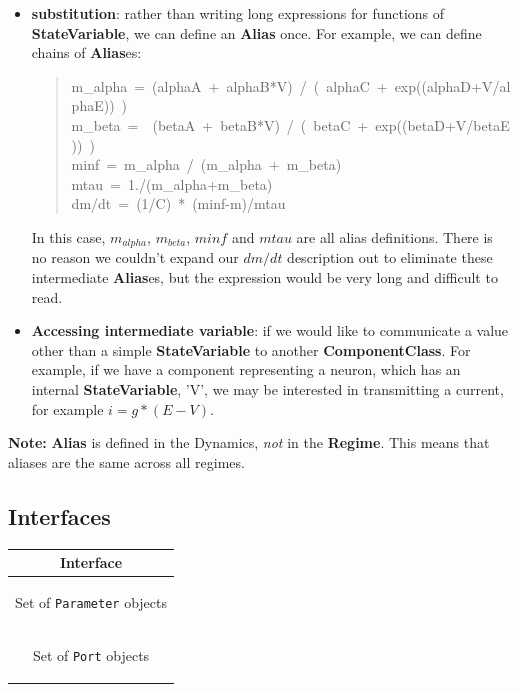 \documentclass{article}
\newcommand{\note}[1]{%
\begin{center}
\colorbox{issuecolor}{\parbox{0.8\linewidth}{\textbf{Note:} #1}}
\end{center}%
}
\newcommand{\ComponentClass}{{\bf{ComponentClass}}\xspace}
\newcommand{\StateVariable}{{\bf{StateVariable}}\xspace}
\newcommand{\Alias}{{\bf{Alias}}\xspace}
\newcommand{\Aliases}{{\bf{Alias}}es\xspace}
\newcommand{\Regime}{{\bf{Regime}}\xspace}
\begin{document}
\begin{itemize}
\item {\bf substitution}: rather than writing long expressions for functions of
\StateVariable, we can define an \Alias once. For example, we can define chains
of \Aliases:
%
\begin{quote}{\ttfamily \raggedright \noindent
m\_alpha~=~(alphaA~+~alphaB*V)~/~(~alphaC~+~exp((alphaD+V/alphaE))~)\\
m\_beta~=~~(betaA~+~betaB*V)~/~(~betaC~+~exp((betaD+V/betaE))~)\\
minf~=~m\_alpha~/~(m\_alpha~+~m\_beta)\\
mtau~=~1./(m\_alpha+m\_beta)\\
dm/dt~=~(1/C)~*~(minf-m)/mtau
}
\end{quote}

In this case, $m_{alpha}$, $m_{beta}$, $minf$ and $mtau$ are all
alias definitions. There is no reason we couldn't expand our $dm/dt$
description out to eliminate these intermediate \Aliases, but the expression
would be very long and difficult to read.

\item {\bf Accessing intermediate variable}: if we would like to communicate a
value other than a simple \StateVariable to another \ComponentClass. For
example, if we have a component representing a
neuron, which has an internal \StateVariable, 'V', we may be interested in
transmitting a current, for example $i=g*(E-V)$.

\end{itemize}

\note{\Alias is defined in the Dynamics, \emph{not} in the
\Regime. This means that aliases are the same across all regimes.}

\subsection{Interfaces}

\begin{table}[htb]
\center
\begin{tabular}{|c|}
\hline
\hline
Interface \\
\hline
\colorbox{issuecolor}{\parbox{0.4\linewidth}
{\center Set of {\tt Parameter} objects}} \\
\hline
\colorbox{issuecolor}{\parbox{0.4\linewidth}
{\center Set of {\tt Port} objects}} \\
\hline
\end{tabular}
\end{table}
\end{document}
